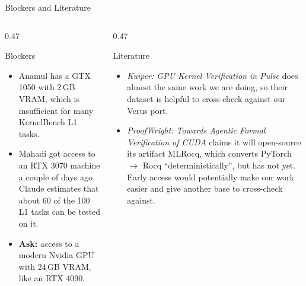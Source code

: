 \documentclass[aspectratio=169,10pt]{beamer}
\begin{document}
\begin{frame}{Blockers and Literature}

\setlength\leftmargini{1.1em}
\begin{columns}[T]
\begin{column}{0.47\textwidth}
\begin{codebox}[lgRed]{Blockers}
\scriptsize\raggedright
\begin{itemize}\setlength\itemsep{3pt}
  \item Anamul has a GTX 1050 with 2\,GB VRAM, which is insufficient for many KernelBench L1 tasks.
  \item Mahadi got access to an RTX 3070 machine a couple of days ago. Claude estimates that
        about 60 of the 100 L1 tasks can be tested on it.
  \item \textbf{Ask:} access to a modern Nvidia GPU with 24\,GB VRAM, like an RTX 4090.
\end{itemize}
\end{codebox}
\end{column}

\begin{column}{0.47\textwidth}
\begin{codebox}[lgTeal]{Literature}
\scriptsize\raggedright
\begin{itemize}\setlength\itemsep{3pt}
  \item \emph{Kuiper: GPU Kernel Verification in Pulse} does almost the same work we are doing,
        so their dataset is helpful to cross-check against our Verus port.
  \item \emph{ProofWright: Towards Agentic Formal Verification of CUDA} claims it will open-source
        its artifact MLRocq, which converts PyTorch $\to$ Rocq ``deterministically'', but has not yet.
        Early access would potentially make our work easier and give another base to cross-check against.
\end{itemize}
\end{codebox}
\end{column}
\end{columns}

\end{frame}

\end{document}
